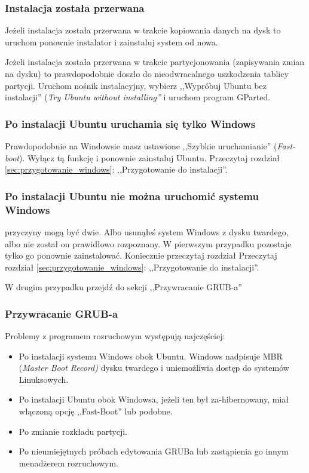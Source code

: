 \subsubsection{Instalacja została przerwana}
Jeżeli instalacja została przerwana w trakcie kopiowania danych na dysk to uruchom ponownie instalator i zainstaluj system od nowa.

Jeżeli instalacja została przerwana w trakcie partycjonowania (zapisywania zmian na dysku) to prawdopodobnie doszło do nieodwracalnego uszkodzenia tablicy partycji. Uruchom nośnik instalacyjny, wybierz ,,Wypróbuj Ubuntu bez instalacji'' (\textit{Try Ubuntu without installing''} i uruchom program GParted.

\subsubsection{Po instalacji Ubuntu uruchamia się tylko Windows}
Prawdopodobnie na Windowsie masz ustawione ,,Szybkie uruchamianie'' (\textit{Fast-boot}). Wyłącz tą funkcję i ponownie zainstaluj Ubuntu. Przeczytaj rozdział \ref{sec:przygotowanie_windows}: ,,Przygotowanie do instalacji''.

\subsubsection{Po instalacji Ubuntu nie można uruchomić systemu Windows}
przyczyny mogą być dwie. Albo usunąłeś system Windows z dysku twardego, albo nie został on prawidłowo rozpoznany. W pierwszym przypadku pozostaje tylko go ponownie zainstalować. Koniecznie przeczytaj rozdział Przeczytaj rozdział \ref{sec:przygotowanie_windows}: ,,Przygotowanie do instalacji''.

W drugim przypadku przejdź do sekcji ,,Przywracanie GRUB-a''

\subsubsection{Przywracanie GRUB-a}
Problemy z programem rozruchowym występują najczęściej:
\begin{itemize}
\item Po instalacji systemu Windows obok Ubuntu. Windows nadpisuje MBR (\textit{Master Boot Record)} dysku twardego i uniemożliwia dostęp do systemów Linuksowych.
\item Po instalacji Ubuntu obok Windowsa, jeżeli ten był za-hibernowany, miał włączoną opcję ,,Fast-Boot'' lub podobne.
\item Po zmianie rozkładu partycji.
\item Po nieumiejętnych próbach edytowania GRUBa lub zastąpienia go innym menadżerem rozruchowym.
\end{itemize}

